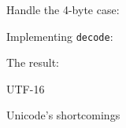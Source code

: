 \documentclass[../index.tex]{subfiles}
\begin{document}
\begin{frame}{\currenttitle}
%
%
  Handle the 4-byte case: \\
  \vspace*{1em}
\end{frame}

\begin{frame}{\currenttitle}
%
%
  Implementing \texttt{decode}: \\
  \vspace*{1em}
\end{frame}

\begin{frame}[fragile]{\currenttitle}
  

  \vspace*{1em}

  The result:

  
\end{frame}

\renewcommand{\currenttitle}{UTF-16}
\begin{frame}{\currenttitle}
\end{frame}

\renewcommand{\currenttitle}{Unicode's shortcomings}
\begin{frame}{\currenttitle}
\end{frame}

\end{document}
